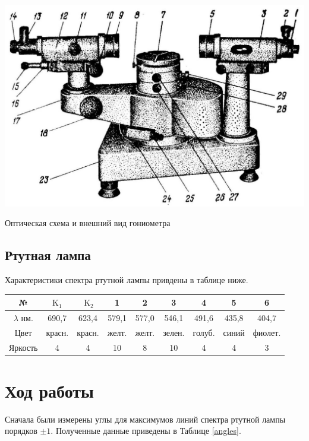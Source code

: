 \begin{center}
\includegraphics[scale=0.2]{2023_04_02_a48ae02e429ba186bcd7g-2(1)}

Оптическая схема и внешний вид гониометра

\end{center}

\subsection*{Ртутная лампа}

Характеристики спектра ртутной лампы привдены в таблице ниже.

\begin{center}
\begin{tabular}{|c|c|c|c|c|c|c|c|c|}
\hline
№ & $\mathrm{K}_{1}$ & $\mathrm{~K}_{2}$ & 1 & 2 & 3 & 4 & 5 & 6 \\
\hline
$\lambda$ нм. & 690,7 & 623,4 & 579,1 & 577,0 & 546,1 & 491,6 & 435,8 & 404,7 \\
\hline
Цвет & красн. & красн. & желт. & желт. & зелен. & голуб. & синий & фиолет. \\
\hline
Яркость & 4 & 4 & 10 & 8 & 10 & 4 & 4 & 3 \\
\hline
\end{tabular}
\end{center}

\section*{Ход работы}

Сначала были измерены углы для максимумов линий спектра ртутной лампы порядков $\pm 1$. Полученные данные приведены в Таблице \ref{angles}.

